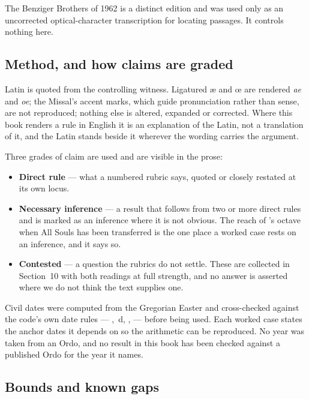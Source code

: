 The Benziger Brothers  of 1962 is a distinct
edition and was used only as an uncorrected optical-character transcription for
locating passages. It controls nothing here.

\subsection{Method, and how claims are graded}

Latin is quoted from the controlling witness. Ligatured \ae{} and \oe{} are
rendered \emph{ae} and \emph{oe}; the Missal's accent marks, which guide
pronunciation rather than sense, are not reproduced; nothing else is altered,
expanded or corrected. Where this book renders a rule in English it is an
explanation of the Latin, not a translation of it, and the Latin stands beside
it wherever the wording carries the argument.

Three grades of claim are used and are visible in the prose:

\begin{itemize}
\item \textbf{Direct rule} --- what a numbered rubric says, quoted or closely
restated at its own locus.
\item \textbf{Necessary inference} --- a result that follows from two or more
direct rules and is marked as an inference where it is not obvious. The reach
of 's octave when All Souls has been transferred is the one place a
worked case rests on an inference, and it says so.
\item \textbf{Contested} --- a question the rubrics do not settle. These are
collected in Section~10 with both readings at full strength, and no answer is
asserted where we do not think the text supplies one.
\end{itemize}

Civil dates were computed from the Gregorian Easter and cross-checked against
the code's own date rules --- , \,d, ,  --- before
being used. Each worked case states the anchor dates it depends on so the
arithmetic can be reproduced. No year was taken from an Ordo, and no result in
this book has been checked against a published Ordo for the year it names.

\subsection{Bounds and known gaps}


